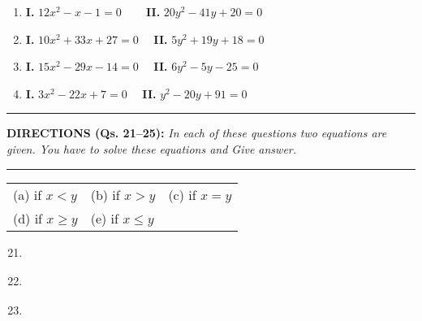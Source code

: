\begin{multicols}{2}
\begin{enumerate}[leftmargin=*]
\item {\bf I.} $12x^2 - x - 1 = 0$ \qquad~~~ {\bf II.} $20y^2 - 41y + 20 = 0$

\item {\bf I.} $10x^2 + 33x + 27 = 0$\quad~~  {\bf II.} $5y^2 + 19y + 18 = 0$

\item {\bf I.} $15x^2 - 29x - 14 = 0$\quad~~ {\bf II.} $6y^2 - 5y - 25 = 0$

\item {\bf I.} $3x^2 - 22x + 7 = 0$\quad~~ {\bf II.} $y^2 - 20y + 91 = 0$

\end{enumerate}

\noindent
\rule{\columnwidth}{1pt}

\noindent
{\sf\bfseries DIRECTIONS (Qs. 21--25):} {\it In each of these questions two equations are given. You have to solve these equations and Give answer.}

\noindent
\rule{\columnwidth}{1pt}

\begin{tabular}{l@{\qquad\quad}l@{\qquad\quad}l}
(a) if $x<y$ & (b) if $x>y$ & (c) if $x=y$\\
(d) if $x\geq y$ & (e) if $x\leq y$
\end{tabular}

\begin{enumerate}[leftmargin=*]
\setcounter{enumi}{20}
\item 
\begin{itemize}
\end{itemize}

\item 
\begin{itemize}
\end{itemize}

\item 
\begin{itemize}
\end{itemize}


\end{enumerate}
\end{multicols}
